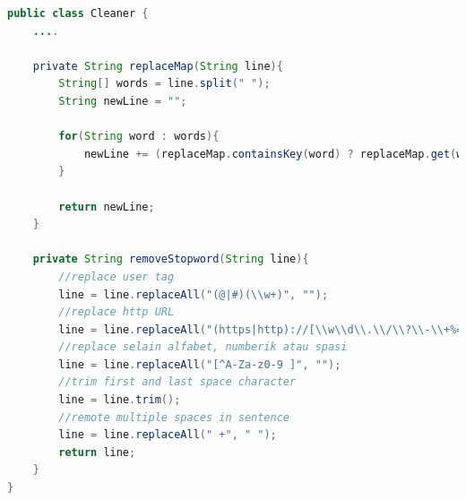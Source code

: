 \begin{lstlisting}[language=Java,basicstyle=\tiny,caption=Cleaner.java,label={lst:kode_cleaner}]
public class Cleaner {
	....
	    
    private String replaceMap(String line){
        String[] words = line.split(" ");
        String newLine = "";
        
        for(String word : words){
            newLine += (replaceMap.containsKey(word) ? replaceMap.get(word).toLowerCase() : word) + " ";
        }
        
        return newLine;
    }
    
    private String removeStopword(String line){
        //replace user tag
        line = line.replaceAll("(@|#)(\\w+)", "");
        //replace http URL
        line = line.replaceAll("(https|http)://[\\w\\d\\.\\/\\?\\-\\+%=&#]+", "");
        //replace selain alfabet, numberik atau spasi
        line = line.replaceAll("[^A-Za-z0-9 ]", "");
        //trim first and last space character
        line = line.trim();
        //remote multiple spaces in sentence
        line = line.replaceAll(" +", " ");
        return line;
    }
}
\end{lstlisting}

